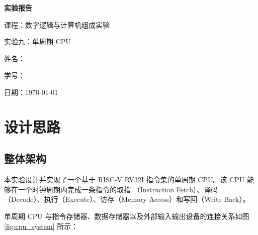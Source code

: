 \documentclass[12pt, a4paper]{ctexart}
\begin{document}
\begin{titlepage}
    \centering
    \vspace*{5cm}
    {\Huge\bfseries 实验报告\par}
    \vspace{2cm}
    {\Large 课程：数字逻辑与计算机组成实验\par}
    \vspace{1cm}
    {\Large 实验九：单周期 CPU\par}
    \vspace{4cm}
    {\large 姓名：\underline{}\par}
    \vspace{1cm}
    {\large 学号：\underline{}\par}
    \vspace{1cm}
    {\large 日期：\today\par}
\end{titlepage}

\tableofcontents
\newpage

\section{设计思路}

\subsection{整体架构}

本实验设计并实现了一个基于 RISC-V RV32I 指令集的单周期 CPU。该 CPU 能够在一个时钟周期内完成一条指令的取指
（Instruction Fetch）、译码（Decode）、执行（Execute）、访存（Memory Access）和写回（Write Back）。

单周期 CPU 与指令存储器、数据存储器以及外部输入输出设备的连接关系如图 \ref{fig:cpu_system} 所示：
\end{document}
